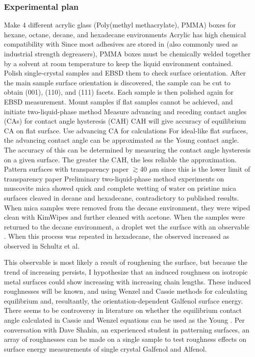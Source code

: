 \subsubsection{Experimental plan}
\begin{outline}[enumerate]
\1 Make 4 different acrylic glass (Poly(methyl methacrylate), PMMA) boxes for hexane, octane, decane, and hexadecane environments
	\2 Acrylic has high chemical compatibility with \nalk[s] \cite{Thermoscientific}		
	\2 Since most adhesives are stored in \nalk[s] (also commonly used as industrial strength degreasers), PMMA boxes must be chemically welded together by a solvent at room temperature to keep the liquid environment contained. 
\1 Polish single-crystal samples and EBSD them to check surface orientation. After the main sample surface orientation is discovered, the sample can be cut to obtain \hkl(001), \hkl(110), and \hkl(111) facets. Each sample is then polished again for EBSD measurement. 
\1 Mount samples if flat samples cannot be achieved, and initiate two-liquid-phase method
	\2 Measure advancing and receding contact angles (CAs) for contact angle hysteresis (CAH)
		\3 CAH will give accuracy of equilibrium CA on flat surface. 
	\2 Use advancing CA for calculations
		\3 For ideal-like flat surfaces, the advancing contact angle can be approximated as the Young contact angle. The accuracy of this can be determined by measuring the contact angle hysteresis on a given surface. The greater the CAH, the less reliable the approximation. 
\1 Pattern surfaces with transparency paper $\gtrsim$40 $\mu$m since this is the lower limit of transparency paper
	\2 Preliminary two-liquid-phase method experiments on muscovite mica showed quick and complete wetting of water on pristine mica surfaces cleaved in decane and hexadecane, contradictory to published results.\cite{Schultz1992} When mica samples were removed from the decane environment, they were wiped clean with KimWipes and further cleaned with acetone. When the samples were returned to the decane environment, a droplet wet the surface with an observable \ca. When this process was repeated in hexadecane, the observed \ca increased as observed in Schultz et al.\cite{Schultz1992} 
	
	This observable \ca is most likely a result of roughening the surface, but because the trend of increasing \ca persists, I hypothesize that an induced roughness on isotropic metal surfaces could show increasing \ca[s] with increasing \nalk chain lengths. These induced roughnesses will be known, and using Wenzel\cite{Wenzel1936,Wenzel1949a} and Cassie\cite{Cassie1944} methods for calculating equilibrium \ca[s] and, resultantly, the orientation-dependent Galfenol surface energy. 
		\3 There seems to be controversy in literature on whether the equilibrium contact angle calculated in Cassie and Wenzel equations can be used as the Young \ca.\cite{Attension2015,Marmur2009b,Bracco2013}
		\3 
	\2 Per conversation with Dave Shahin, an experienced student in patterning surfaces, an array of roughnesses can be made on a single sample to test roughness effects on surface energy measurements of single crystal Galfenol and Alfenol. 
	

\end{outline}
